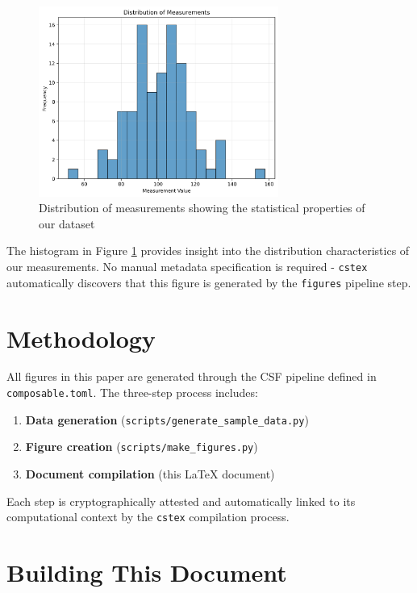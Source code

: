 \documentclass{article}
\begin{document}
\begin{figure}[h]
\centering
\includegraphics[width=0.7\textwidth]{figures/measurement_distribution.png}
\caption{Distribution of measurements showing the statistical properties of our dataset}
\label{fig:distribution}
\end{figure}

The histogram in Figure \ref{fig:distribution} provides insight into the
distribution characteristics of our measurements. No manual metadata
specification is required - \texttt{cstex} automatically discovers that this
figure is generated by the \texttt{figures} pipeline step.

\section{Methodology}

All figures in this paper are generated through the CSF pipeline defined
in \texttt{composable.toml}. The three-step process includes:

\begin{enumerate}
    \item \textbf{Data generation} (\texttt{scripts/generate\_sample\_data.py})
    \item \textbf{Figure creation} (\texttt{scripts/make\_figures.py})
    \item \textbf{Document compilation} (this LaTeX document)
\end{enumerate}

Each step is cryptographically attested and automatically linked to its
computational context by the \texttt{cstex} compilation process.

\section{Building This Document}
\end{document}
